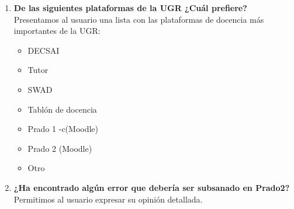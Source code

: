 \begin{enumerate}

  \item \textbf{De las siguientes plataformas de la UGR ¿Cuál prefiere?} Presentamos al usuario una lista con las plataformas de docencia más importantes de la UGR:

  		\begin{itemize}
  			\item DECSAI
            \item Tutor
            \item SWAD
            \item Tablón de docencia
            \item Prado 1 -c(Moodle)
            \item Prado 2 (Moodle)
            \item Otro
		\end{itemize}


  \item \textbf{¿Ha encontrado algún error que debería ser subsanado en Prado2?} Permitimos al usuario expresar su opinión detallada.


\end{enumerate}
